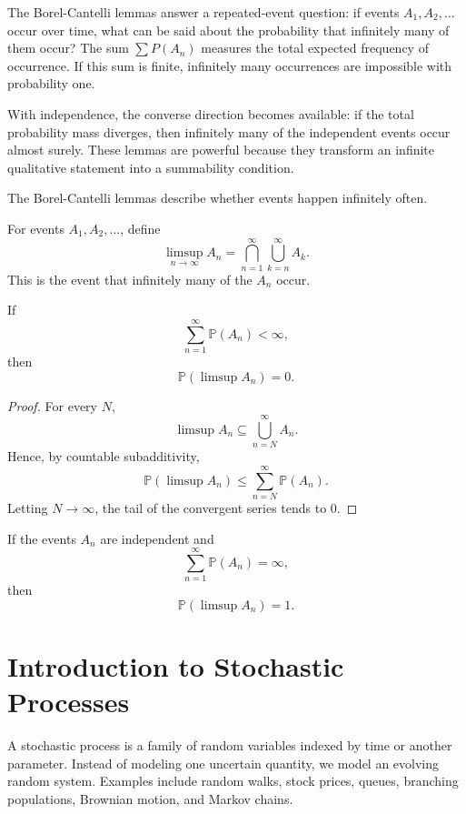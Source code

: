 The Borel-Cantelli lemmas answer a repeated-event question: if events $A_1,A_2,\dots$ occur over time, what can be said about the probability that infinitely many of them occur? The sum $\sum P(A_n)$ measures the total expected frequency of occurrence. If this sum is finite, infinitely many occurrences are impossible with probability one.

With independence, the converse direction becomes available: if the total probability mass diverges, then infinitely many of the independent events occur almost surely. These lemmas are powerful because they transform an infinite qualitative statement into a summability condition.

The Borel-Cantelli lemmas describe whether events happen infinitely often.

\begin{definition}
For events $A_1,A_2,\dots$, define
\[
    \limsup_{n\to\infty}A_n=\bigcap_{n=1}^{\infty}\bigcup_{k=n}^{\infty}A_k.
\]
This is the event that infinitely many of the $A_n$ occur.
\end{definition}

\begin{theorem}
If
\[
    \sum_{n=1}^{\infty}\mathbb{P}(A_n)<\infty,
\]
then
\[
    \mathbb{P}(\limsup A_n)=0.
\]
\end{theorem}

\begin{proof}
For every $N$,
\[
    \limsup A_n\subseteq\bigcup_{n=N}^{\infty}A_n.
\]
Hence, by countable subadditivity,
\[
    \mathbb{P}(\limsup A_n)\leq\sum_{n=N}^{\infty}\mathbb{P}(A_n).
\]
Letting $N\to\infty$, the tail of the convergent series tends to $0$.
\end{proof}

\begin{theorem}
If the events $A_n$ are independent and
\[
    \sum_{n=1}^{\infty}\mathbb{P}(A_n)=\infty,
\]
then
\[
    \mathbb{P}(\limsup A_n)=1.
\]
\end{theorem}

\section{Introduction to Stochastic Processes}


A stochastic process is a family of random variables indexed by time or another parameter. Instead of modeling one uncertain quantity, we model an evolving random system. Examples include random walks, stock prices, queues, branching populations, Brownian motion, and Markov chains.

